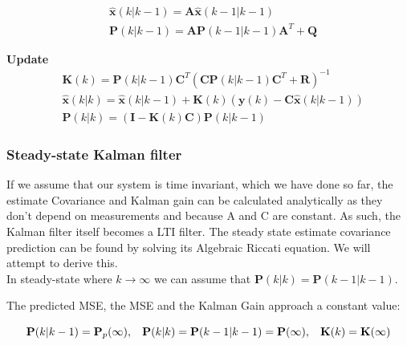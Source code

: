 \begin{align}
	&\hat{\textbf{x}}	(k|k-1) = \textbf{A} \hat{\textbf{x}}	(k-1|k-1) 		\label{eq:Kalman_pred_state_compact} 	\\
	&\textbf{P}			(k|k-1) = \textbf{A}\textbf{P}			(k-1|k-1)\textbf{A}^T+\textbf{Q} 				\label{eq:Kalman_pred_cov_compact} 		
\end{align}

\textbf{Update}
\begin{align}
	&\textbf{K}			(k) 		= \textbf{P}				(k|k-1)\textbf{C}^T(\textbf{C}\textbf{P}	(k|k-1)	\textbf{C}^T + \textbf{R})^{-1}										\label{eq:Kalman_upd_kalman_gain_compact} \\
	&\hat{\textbf{x}}	(k|k) 	= \hat{\textbf{x}}			(k|k-1) + \textbf{K}						(k)	(\textbf{y}		(k) - \textbf{C}\hat{\textbf{x}}		(k|k-1)) 	\label{eq:Kalman_upd_est_state_compact} \\
	&\textbf{P}			(k|k) 	= (\textbf{I} - \textbf{K}	(k)\textbf{C})\textbf{P}					(k|k-1)																		\label{eq:Kalman_upd_est_cov_compact}
\end{align}


\subsubsection{Steady-state Kalman filter}
If we assume that our system is time invariant, which we have done so far, the estimate Covariance and Kalman gain can be calculated analytically as they don't depend on measurements and because A and C are constant. As such, the Kalman filter itself becomes a LTI filter. The steady state estimate covariance prediction can be found by solving its Algebraic Riccati equation. We will attempt to derive this.\\


In steady-state where $k \rightarrow \infty$ we can assume that $\textbf{P}(k|k) = \textbf{P}(k-1|k-1) $. 

The predicted MSE, the MSE and the Kalman Gain approach a constant value:

\begin{equation}
	\textbf{P}(k|k-1) =  \textbf{P}_p(\infty), \hspace{3mm} \textbf{P}(k|k) = \textbf{P}(k-1|k-1) = \textbf{P}(\infty),  \hspace{3mm} \textbf{K}(k) = \textbf{K}(\infty)
\end{equation}

